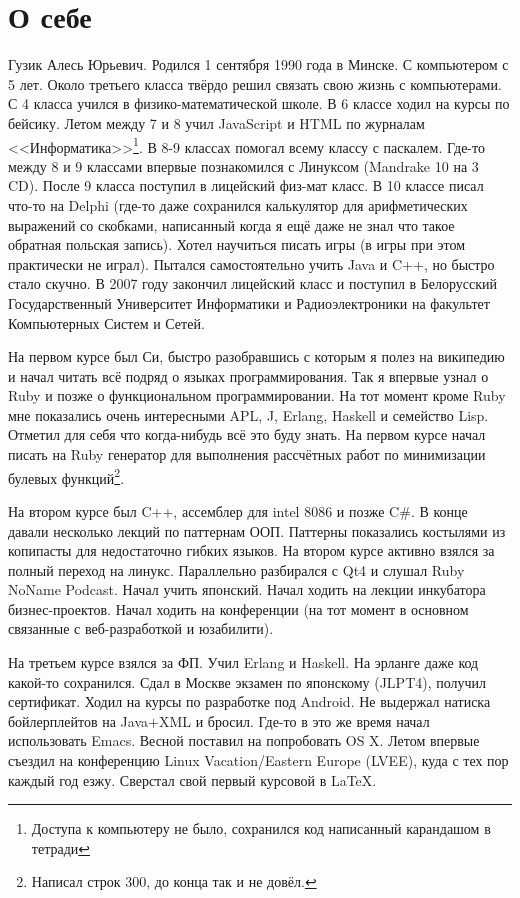 \documentclass[14pt,a4paper]{extarticle}
\begin{document}
\section*{О себе}

Гузик Алесь Юрьевич. Родился 1 сентября 1990 года в Минске. С
компьютером с 5 лет. Около третьего класса твёрдо решил связать свою
жизнь с компьютерами. С 4 класса учился в физико-математической
школе. В 6 классе ходил на курсы по бейсику. Летом между 7 и 8
учил JavaScript и HTML по журналам <<Информатика>>\footnote{Доступа
к компьютеру не было, сохранился код написанный карандашом в тетради}.
В 8-9 классах помогал всему классу с паскалем. Где-то между 8 и 9
классами впервые познакомился с Линуксом (Mandrake 10 на 3 CD).
После 9 класса поступил в лицейский физ-мат класс. В 10 классе писал
что-то на Delphi (где-то даже сохранился калькулятор для
арифметических выражений со скобками, написанный когда я ещё даже не
знал что такое обратная польская запись). Хотел научиться писать игры
(в игры при этом практически не играл). Пытался самостоятельно учить
Java и C++, но быстро стало скучно. В 2007 году закончил лицейский
класс и поступил в Белорусский Государственный Университет Информатики
и Радиоэлектроники на факультет Компьютерных Систем и Сетей.

На первом курсе был Си, быстро разобравшись с которым я полез на
википедию и начал читать всё подряд о языках программирования. Так я впервые узнал о
Ruby и позже о функциональном программировании. На тот момент кроме
Ruby мне показались очень интересными APL, J, Erlang, Haskell и
семейство Lisp. Отметил для себя что когда-нибудь всё это буду знать.
На первом курсе начал писать на Ruby генератор для выполнения
рассчётных работ по минимизации булевых функций\footnote{Написал
строк 300, до конца так и не довёл.}.

На втором курсе был C++, ассемблер для intel 8086 и позже C\#. В конце
давали несколько лекций по паттернам ООП. Паттерны показались
костылями из копипасты для недостаточно гибких языков. На втором курсе
активно взялся за полный переход на линукс. Параллельно разбирался с Qt4
и слушал Ruby NoName Podcast. Начал учить японский. Начал ходить на
лекции инкубатора бизнес-проектов. Начал ходить на конференции (на тот
момент в основном связанные с веб-разработкой и юзабилити).

На третьем курсе взялся за ФП. Учил Erlang и Haskell. На эрланге даже
код какой-то сохранился. Сдал в Москве экзамен по японскому (JLPT4),
получил сертификат. Ходил на курсы по разработке под Android. Не
выдержал натиска бойлерплейтов на Java+XML и бросил. Где-то в это же
время начал использовать Emacs. Весной поставил на попробовать OS X.
Летом впервые съездил на конференцию Linux Vacation/Eastern Europe
(LVEE), куда с тех пор каждый год езжу. Сверстал свой первый курсовой
в \LaTeX.
\end{document}
